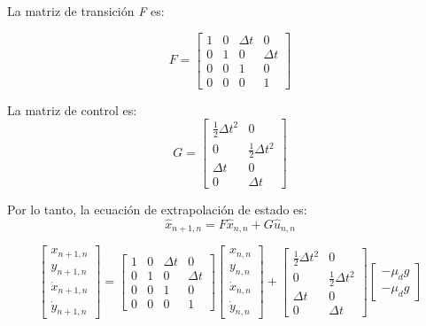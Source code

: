 La matriz de transición \textit{F} es:

\begin{equation}
F = \begin{bmatrix}
1 & 0 & \Delta t & 0\\ 
0 & 1 & 0 & \Delta t\\ 
0 & 0 & 1 & 0\\ 
0 & 0 & 0 & 1
\end{bmatrix}
\label{eq:transition_matrix}
\end{equation}

La matriz de control es:
\begin{equation}
G = \begin{bmatrix}
\frac{1}{2}  \Delta t ^2 & 0 \\ 
0 & \frac{1}{2} \Delta t ^2 \\ 
 \Delta t & 0 \\ 
0 & \Delta t
\end{bmatrix}
\label{eq:control_matrix}
\end{equation}

Por lo tanto, la ecuación de extrapolación de estado es:
\begin{equation}
\hat{x}_{n+1,n} = F \hat{x}_{n,n} + G \hat{u}_{n,n}
\label{eq:extrapolation_equation}
\end{equation}

\begin{equation}
\begin{bmatrix}
x_{n+1,n}\\ 
y_{n+1,n}\\ 
\dot{x}_{n+1,n}\\ 
\dot{y}_{n+1,n}
\end{bmatrix}
=
\begin{bmatrix}
1 & 0 & \Delta t & 0\\ 
0 & 1 & 0 & \Delta t\\ 
0 & 0 & 1 & 0\\ 
0 & 0 & 0 & 1
\end{bmatrix}
\!
\begin{bmatrix}
x_{n,n}\\ 
y_{n,n}\\ 
\dot{x}_{n,n}\\ 
\dot{y}_{n,n}
\end{bmatrix}
+
\begin{bmatrix}
\frac{1}{2}  \Delta t ^2 & 0 \\ 
0 & \frac{1}{2} \Delta t ^2 \\ 
 \Delta t & 0 \\ 
0 & \Delta t
\end{bmatrix}
\!
\begin{bmatrix}
-\mu_d g\\
-\mu_d g
\end{bmatrix}
\end{equation}

